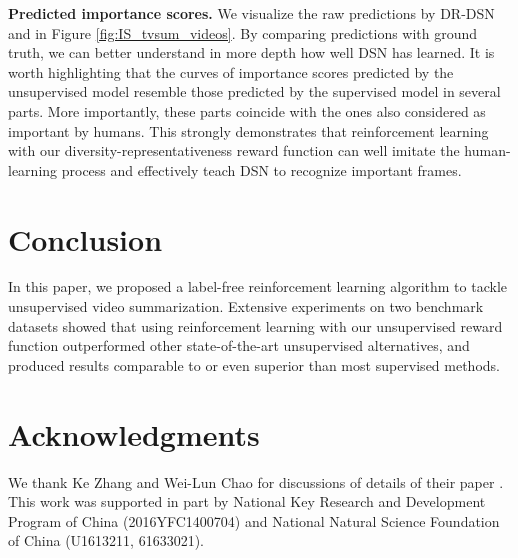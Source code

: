 \documentclass[letterpaper]{article} \usepackage{aaai18}  \usepackage{times}  \usepackage{helvet}  \usepackage{courier}  \usepackage{url}  \usepackage{graphicx}
\begin{document}
{\bf Predicted importance scores.} We visualize the raw predictions by DR-DSN and  in Figure \ref{fig:IS_tvsum_videos}. By comparing predictions with ground truth, we can better understand in more depth how well DSN has learned. It is worth highlighting that the curves of importance scores predicted by the unsupervised model resemble those predicted by the supervised model in several parts. More importantly, these parts coincide with the ones also considered as important by humans. This strongly demonstrates that reinforcement learning with our diversity-representativeness reward function can well imitate the human-learning process and effectively teach DSN to recognize important frames.

\section{Conclusion}
In this paper, we proposed a label-free reinforcement learning algorithm to tackle unsupervised video summarization. Extensive experiments on two benchmark datasets showed that using reinforcement learning with our unsupervised reward function outperformed other state-of-the-art unsupervised alternatives, and produced results comparable to or even superior than most supervised methods.

\section{Acknowledgments}
We thank Ke Zhang and Wei-Lun Chao for discussions of details of their paper \cite{zhang2016video}. This work was supported in part by National Key Research and Development Program of China (2016YFC1400704) and 
National Natural Science Foundation of China (U1613211, 61633021).




\end{document}
